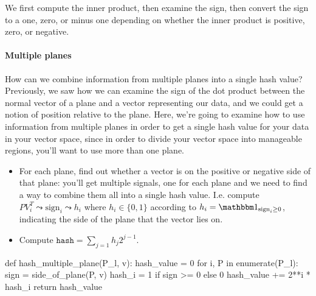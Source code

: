 \documentclass[12pt]{article}
\begin{document}
We first compute the inner product, then examine the sign, then convert the sign to a one, zero, or minus one depending on whether the inner product is positive, zero, or negative.

\paragraph{Multiple planes} How can we combine information from multiple planes into a single hash value? Previously, we saw how we can examine the sign of the dot product between the normal vector of a plane and a vector representing our data, and we could get a notion of position relative to the plane. Here, we're going to examine how to use information from multiple planes in order to get a single hash value for your data in your vector space, since in order to divide your vector space into manageable regions, you'll want to use more than one plane.

\begin{itemize}
\item For each plane, find out whether a vector is on the positive or negative side of that plane: you'll get multiple signals, one for each plane and we need to find a way to combine them all into a single hash value. I.e. compute $P V_i^T \leadsto \textrm{sign}_i \leadsto h_i$ where $h_i \in \{0,1\}$ according to $h_i = \mathbbm 1_{\textrm{sign}_i \geq 0}$, indicating the side of the plane that the vector lies on.
\item Compute $\texttt{hash} = \sum_{j=1} h_j 2^{j-1}$.
\end{itemize}

\begin{python}
def hash_multiple_plane(P_l, v):
  hash_value = 0
  for i, P in enumerate(P_l):
    sign = side_of_plane(P, v)
    hash_i = 1 if sign >= 0 else 0
    hash_value += 2**i * hash_i
  return hash_value
\end{python}
\end{document}
